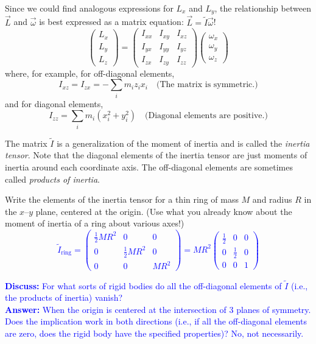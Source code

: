 \documentclass[11pt, letterpaper, openany]{book}
\newenvironment{exercise}[1][Exercise]{%
  \tcolorbox[blanker, breakable, left=1em,
    before skip=1em, after skip=1em,
    borderline west={3pt}{0pt}{PhysNavy},
    colback=PhysCream,
    before upper={\textcolor{PhysNavy}{\sffamily\bfseries #1:}\space}
  ]%
}{%
  \endtcolorbox%
}
\begin{document}
Since we could find analogous expressions for $L_x$ and $L_y$, the relationship between $\vec{L}$ and $\vec{\omega}$ is best expressed as a matrix equation: $\vec{L} = \tilde{I}\vec{\omega}$!
\[ \begin{pmatrix} L_x \\ L_y \\ L_z \end{pmatrix} = \begin{pmatrix} I_{xx} & I_{xy} & I_{xz} \\ I_{yx} & I_{yy} & I_{yz} \\ I_{zx} & I_{zy} & I_{zz} \end{pmatrix} \begin{pmatrix} \omega_x \\ \omega_y \\ \omega_z \end{pmatrix} \]
where, for example, for off-diagonal elements,
\[ I_{xz} = I_{zx} = -\sum_i m_i z_i x_i \quad \text{(The matrix is symmetric.)} \]
and for diagonal elements,
\[ I_{zz} = \sum_i m_i(x_i^2 + y_i^2) \quad \text{(Diagonal elements are positive.)} \]

The matrix $\tilde{I}$ is a generalization of the moment of inertia and is called the \textit{inertia tensor}. Note that the diagonal elements of the inertia tensor are just moments of inertia around each coordinate axis. The off-diagonal elements are sometimes called \textit{products of inertia}.

\begin{exercise}[Exercise 9]
Write the elements of the inertia tensor for a thin ring of mass $M$ and radius $R$ in the $x$--$y$ plane, centered at the origin. (Use what you already know about the moment of inertia of a ring about various axes!) \\
\textcolor{blue}{
\[ \tilde{I}_{\text{ring}} = \begin{pmatrix} \frac{1}{2}MR^2 & 0 & 0 \\ 0 & \frac{1}{2}MR^2 & 0 \\ 0 & 0 & MR^2 \end{pmatrix} = MR^2 \begin{pmatrix} \frac{1}{2} & 0 & 0 \\ 0 & \frac{1}{2} & 0 \\ 0 & 0 & 1 \end{pmatrix} \]
}
\end{exercise}

\textcolor{blue}{\textbf{Discuss:} For what sorts of rigid bodies do all the off-diagonal elements of $\tilde{I}$ (i.e., the products of inertia) vanish? \\
\textbf{Answer:} When the origin is centered at the intersection of 3 planes of symmetry. \\
Does the implication work in both directions (i.e., if all the off-diagonal elements are zero, does the rigid body have the specified properties)? No, not necessarily.}
\end{document}
